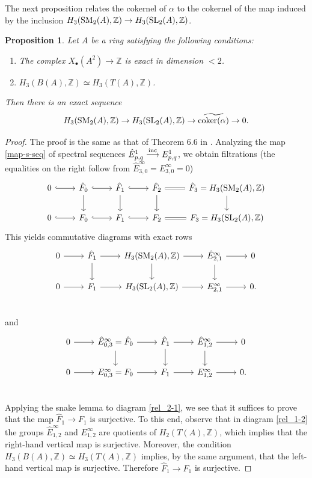 \documentclass[11pt]{amsart}
\theoremstyle{definition}
\theoremstyle{plain}
\newtheorem{prp}[ntn]{Proposition}
\numberwithin{equation}{section}
\newcommand{\z}{\mathbb{Z}}
\newcommand{\SL}{\mathit{{\rm SL}}}
\newcommand{\SM}{\mathit{{\rm SM}}}
\newcommand{\inc}{{\rm inc}}
\newcommand{\coker}{{\rm coker}}
\begin{document}
The next proposition relates the cokernel of $\alpha$ to the cokernel of the map induced by the inclusion $H_3(\SM_2(A),\z)\to H_3(\SL_2(A),\z)$. 
\begin{prp}\label{prp-sm2-sl2}
Let $A$ be a ring satisfying the following conditions:
\begin{enumerate}
    \item The complex $X_{\bullet}(A^2)\to\z$ is exact in dimension $<2$.
    \item $H_3(B(A),\z)\simeq H_3(T(A),\z)$.
\end{enumerate}
Then there is an exact sequence
\[
H_3(\SM_2(A),\z)\to H_3(\SL_2(A),\z)\to \widetilde{\coker(\alpha)}\to 0.
\]
\end{prp}
\begin{proof}
    The proof is the same as that of Theorem 6.6 in \cite{B-E--2023}. Analyzing the map \eqref{map-s-seq} of spectral sequences $\hat{E}^1_{p,q}\overset{\inc}{\longrightarrow} E^1_{p,q}$, we obtain filtrations (the equalities on the right follow from $\hat{E}^{\infty}_{3,0}=E^{\infty}_{3,0}=0$)
    \[
    \begin{tikzcd}
        0\ar[r,hook] & \hat{F}_0 \ar[r,hook]\ar[d] & \hat{F}_1 \ar[r,hook]\ar[d] & \hat{F}_2 \ar[r,equal]\ar[d] & \hat{F}_3 = H_3(\SM_2(A),\z)\ar[d]\\
        0\ar[r,hook] & F_0 \ar[r,hook] & F_1 \ar[r,hook] & F_2 \ar[r,equal] & F_3 = H_3(\SL_2(A),\z)
    \end{tikzcd}
    \]
    This yields commutative diagrams with exact rows
    \begin{equation}
    \label{rel_2-1}
    \begin{tikzcd}
        0 \ar[r] & \hat{F}_1 \ar[r]\ar[d] & H_3(\SM_2(A),\z)\ar[r]\ar[d] & \hat{E}^{\infty}_{2,1}\ar[r]\ar[d] & 0\\
        0 \ar[r] & F_1 \ar[r] & H_3(\SL_2(A),\z)\ar[r] & E^{\infty}_{2,1}\ar[r] & 0.\\
    \end{tikzcd}    
    \end{equation}
    and
    \begin{equation}
    \label{rel_1-2}
    \begin{tikzcd}
        0 \ar[r] & \hat{E}^{\infty}_{0,3}=\hat{F}_0 \ar[r]\ar[d] & \hat{F}_1 \ar[r]\ar[d] & \hat{E}^{\infty}_{1,2}\ar[r]\ar[d] & 0\\
        0 \ar[r] & E^{\infty}_{0,3}=F_0 \ar[r] & F_1 \ar[r] & E^{\infty}_{1,2}\ar[r] & 0.\\
    \end{tikzcd}    
    \end{equation}
    Applying the snake lemma to diagram \eqref{rel_2-1}, we see that it suffices to prove that the map $\hat{F}_1\to F_1$ is surjective. To this end, observe that in diagram \eqref{rel_1-2} the groups $\hat{E}^{\infty}_{1,2}$ and $E^{\infty}_{1,2}$ are quotients of $H_2(T(A),\z)$, which implies that the right-hand vertical map is surjective. Moreover, the condition $H_3(B(A),\z)\simeq H_3(T(A),\z)$ implies, by the same argument, that the left-hand vertical map is surjective. Therefore $\hat{F}_1\to F_1$ is surjective.
\end{proof}
\end{document}
